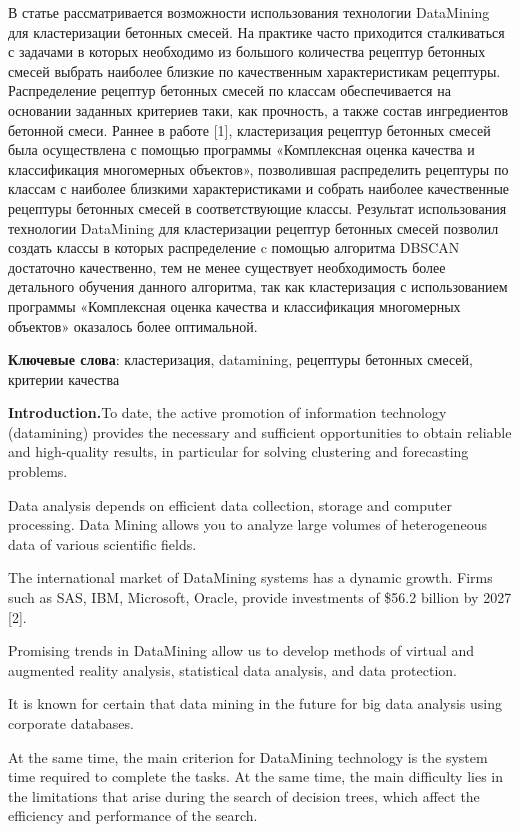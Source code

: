 В статье рассматривается возможности использования технологии DataMining
для кластеризации бетонных смесей. На практике часто приходится
сталкиваться с задачами в которых необходимо из большого количества
рецептур бетонных смесей выбрать наиболее близкие по качественным
характеристикам рецептуры. Распределение рецептур бетонных смесей по
классам обеспечивается на основании заданных критериев таки, как
прочность, а также состав ингредиентов бетонной смеси. Раннее в работе
{[}1{]}, кластеризация рецептур бетонных смесей была осуществлена с
помощью программы «Комплексная оценка качества и классификация
многомерных объектов», позволившая распределить рецептуры по классам с
наиболее близкими характеристиками и собрать наиболее качественные
рецептуры бетонных смесей в соответствующие классы. Результат
использования технологии DataMining для кластеризации рецептур бетонных
смесей позволил создать классы в которых распределение c помощью
алгоритма DBSCAN достаточно качественно, тем не менее существует
необходимость более детального обучения данного алгоритма, так как
кластеризация с использованием программы «Комплексная оценка качества и
классификация многомерных объектов» оказалось более оптимальной.

{\bfseries Ключевые слова}: кластеризация, datamining, рецептуры бетонных
смесей, критерии качества

{\bfseries Introduction.}To date, the active promotion of information
technology (datamining) provides the necessary and sufficient
opportunities to obtain reliable and high-quality results, in particular
for solving clustering and forecasting problems.

Data analysis depends on efficient data collection, storage and computer
processing. Data Mining allows you to analyze large volumes of
heterogeneous data of various scientific fields.

The international market of DataMining systems has a dynamic growth.
Firms such as SAS, IBM, Microsoft, Oracle, provide investments of \$56.2
billion by 2027 {[}2{]}.

Promising trends in DataMining allow us to develop methods of virtual
and augmented reality analysis, statistical data analysis, and data
protection.

It is known for certain that data mining in the future for big data
analysis using corporate databases.

At the same time, the main criterion for DataMining technology is the
system time required to complete the tasks. At the same time, the main
difficulty lies in the limitations that arise during the search of
decision trees, which affect the efficiency and performance of the
search.

